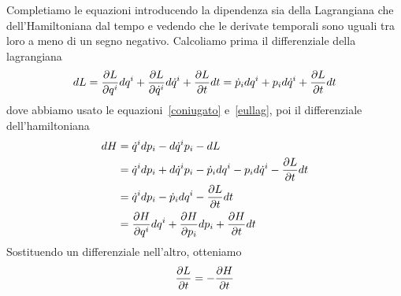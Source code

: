     Completiamo le equazioni introducendo la dipendenza sia della Lagrangiana che dell'Hamiltoniana dal tempo e vedendo che le derivate temporali sono uguali tra loro a meno di un segno negativo. Calcoliamo prima il differenziale della lagrangiana
    \begin{equation*}
        dL = \frac{\partial L}{\partial q^i} dq^i + \frac{\partial L}{\partial\dot q^i} d\dot q^i + \frac{\partial L}{\partial t} dt = \dot p_i dq^i + p_i d\dot q^i + \frac{\partial L}{\partial t} dt 
    \end{equation*}
    dove abbiamo usato le equazioni~\eqref{coniugato} e~\eqref{eullag}, poi il differenziale dell'hamiltoniana
    \begin{equation*}
    \begin{aligned}
        dH & = \dot q^i dp_i - d \dot q^i p_i - dL \\ & = \dot q^i dp_i + d \dot q^i p_i - \dot p_i dq^i - p_i d\dot q^i - \frac{\partial L}{\partial t} dt \\ & = \dot q^i dp_i - \dot p_i dq^i - \frac{\partial L}{\partial t} dt \\ & = \frac{\partial H}{\partial q^i} dq^i + \frac{\partial H}{\partial p_i} dp_i + \frac{\partial H}{\partial t} dt
    \end{aligned}
    \end{equation*}
    Sostituendo un differenziale nell'altro, otteniamo 
    \begin{equation*}
        \frac{\partial L}{\partial t} = - \frac{\partial H}{\partial t}
    \end{equation*}

\hfill 

